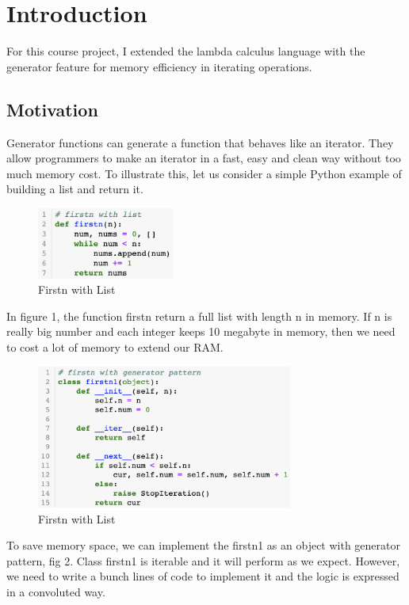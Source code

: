 
\section{Introduction}

For this course project, I extended the  lambda calculus language with the generator feature for memory efficiency in iterating operations.

\subsection{Motivation}
Generator functions can generate a function that behaves like an iterator. They allow programmers to make an iterator in a fast, easy and clean way without too much memory cost. To illustrate this, let us consider a simple Python example of building a list and return it\cite{generators}.
%
\begin{figure}[H]
	\centering
	\includegraphics[width=0.4\textwidth]{figures/fstn}
	\caption{Firstn with List}
\end{figure}
%
In figure 1, the function firstn return a full list with length n in memory. If n is really big number and each integer keeps 10 megabyte in memory, then we need to cost a lot of memory to extend our RAM.
%
\begin{figure}[H]
	\centering
	\includegraphics[width=0.75\textwidth]{figures/fstn1}
	\caption{Firstn with List}
\end{figure}
%
To save memory space, we can implement the firstn1 as an object with generator pattern, fig 2. Class firstn1 is iterable and it will perform as we expect. However, we need to write a bunch lines of code to implement it and the logic is expressed in a convoluted way.

